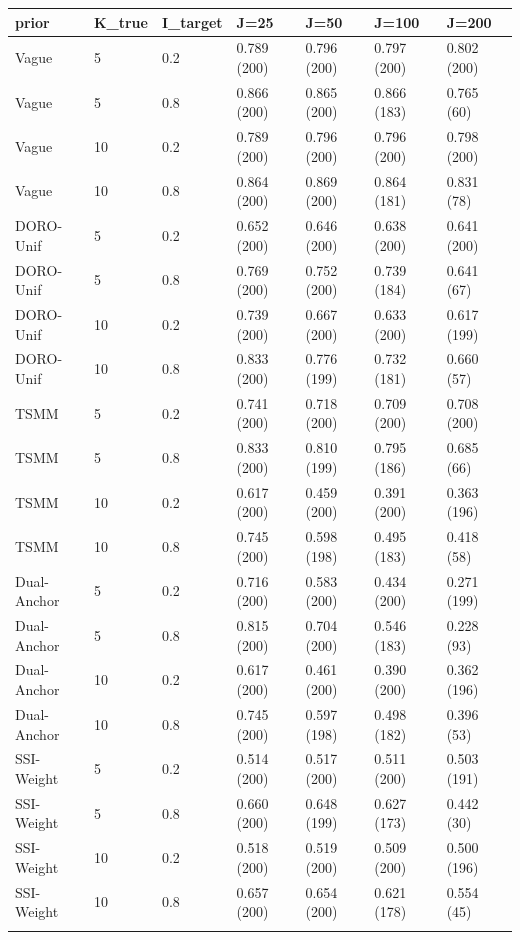 \begin{longtable}{lllllll}
\toprule
prior & K\_true & I\_target & J=25 & J=50 & J=100 & J=200 \\
\midrule\endhead
Vague & 5 & 0.2 & 0.789 (200) & 0.796 (200) & 0.797 (200) & 0.802 (200) \\ \addlinespace[3pt]
Vague & 5 & 0.8 & 0.866 (200) & 0.865 (200) & 0.866 (183) & 0.765 (60) \\ \addlinespace[3pt]
Vague & 10 & 0.2 & 0.789 (200) & 0.796 (200) & 0.796 (200) & 0.798 (200) \\ \addlinespace[3pt]
Vague & 10 & 0.8 & 0.864 (200) & 0.869 (200) & 0.864 (181) & 0.831 (78) \\ \addlinespace[3pt]
DORO-Unif & 5 & 0.2 & 0.652 (200) & 0.646 (200) & 0.638 (200) & 0.641 (200) \\ \addlinespace[3pt]
DORO-Unif & 5 & 0.8 & 0.769 (200) & 0.752 (200) & 0.739 (184) & 0.641 (67) \\ \addlinespace[3pt]
DORO-Unif & 10 & 0.2 & 0.739 (200) & 0.667 (200) & 0.633 (200) & 0.617 (199) \\ \addlinespace[3pt]
DORO-Unif & 10 & 0.8 & 0.833 (200) & 0.776 (199) & 0.732 (181) & 0.660 (57) \\ \addlinespace[3pt]
TSMM & 5 & 0.2 & 0.741 (200) & 0.718 (200) & 0.709 (200) & 0.708 (200) \\ \addlinespace[3pt]
TSMM & 5 & 0.8 & 0.833 (200) & 0.810 (199) & 0.795 (186) & 0.685 (66) \\ \addlinespace[3pt]
TSMM & 10 & 0.2 & 0.617 (200) & 0.459 (200) & 0.391 (200) & 0.363 (196) \\ \addlinespace[3pt]
TSMM & 10 & 0.8 & 0.745 (200) & 0.598 (198) & 0.495 (183) & 0.418 (58) \\ \addlinespace[3pt]
Dual-Anchor & 5 & 0.2 & 0.716 (200) & 0.583 (200) & 0.434 (200) & 0.271 (199) \\ \addlinespace[3pt]
Dual-Anchor & 5 & 0.8 & 0.815 (200) & 0.704 (200) & 0.546 (183) & 0.228 (93) \\ \addlinespace[3pt]
Dual-Anchor & 10 & 0.2 & 0.617 (200) & 0.461 (200) & 0.390 (200) & 0.362 (196) \\ \addlinespace[3pt]
Dual-Anchor & 10 & 0.8 & 0.745 (200) & 0.597 (198) & 0.498 (182) & 0.396 (53) \\ \addlinespace[3pt]
SSI-Weight & 5 & 0.2 & 0.514 (200) & 0.517 (200) & 0.511 (200) & 0.503 (191) \\ \addlinespace[3pt]
SSI-Weight & 5 & 0.8 & 0.660 (200) & 0.648 (199) & 0.627 (173) & 0.442 (30) \\ \addlinespace[3pt]
SSI-Weight & 10 & 0.2 & 0.518 (200) & 0.519 (200) & 0.509 (200) & 0.500 (196) \\ \addlinespace[3pt]
SSI-Weight & 10 & 0.8 & 0.657 (200) & 0.654 (200) & 0.621 (178) & 0.554 (45) \\ \addlinespace[3pt]
\bottomrule\end{longtable}
